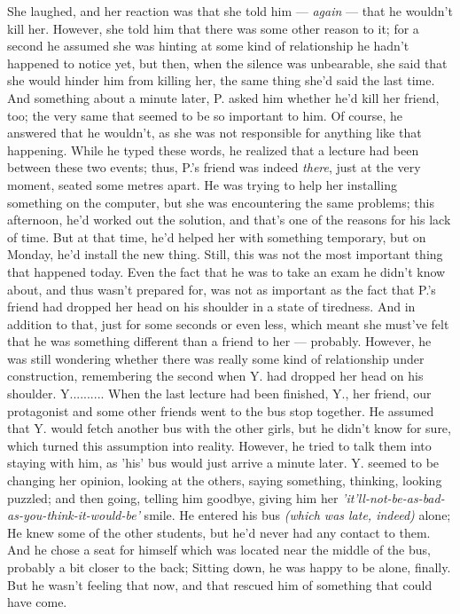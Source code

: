 She laughed, and her reaction was that she told him --- \emph{again} --- that he wouldn't kill her. However, she told him that there was some other reason to it; for a second he assumed she was hinting at some kind of relationship he hadn't happened to notice yet, but then, when the silence was unbearable, she said that she would hinder him from killing her, the same thing she'd said the last time. And something about a minute later, P. asked him whether he'd kill her friend, too; the very same that seemed to be so important to him. Of course, he answered that he wouldn't, as she was not responsible for anything like that happening. 
While he typed these words, he realized that a lecture had been between these two events; thus, P.'s friend was indeed \emph{there}, just at the very moment, seated some metres apart. He was trying to help her installing something on the computer, but she was encountering the same problems; this afternoon, he'd worked out the solution, and that's one of the reasons for his lack of time. But at that time, he'd helped her with something temporary, but on Monday, he'd install the new thing. 
Still, this was not the most important thing that happened today. Even the fact that he was to take an exam he didn't know about, and thus wasn't prepared for, was not as important as the fact that P.'s friend had dropped her head on his shoulder in a state of tiredness. 
And in addition to that, just for some seconds or even less, which meant she must've felt that he was something different than a friend to her --- probably. However, he was still wondering whether there was really some kind of relationship under construction, remembering the second when Y. had dropped her head on his shoulder. 
Y..........
When the last lecture had been finished, Y., her friend, our protagonist and some other friends went to the bus stop together. He assumed that Y. would fetch another bus with the other girls, but he didn't know for sure, which turned this assumption into reality. However, he tried to talk them into staying with him, as 'his' bus would just arrive a minute later. Y. seemed to be changing her opinion, looking at the others, saying something, thinking, looking puzzled; and then going, telling him goodbye, giving him her \emph{'it'll-not-be-as-bad-as-you-think-it-would-be'} smile. 
He entered his bus \emph{(which was late, indeed)} alone; He knew some of the other students, but he'd never had any contact to them. 
And he chose a seat for himself which was located near the middle of the bus, probably a bit closer to the back; Sitting down, he was happy to be alone, finally. But he wasn't feeling that now, and that rescued him of something that could have come. 
